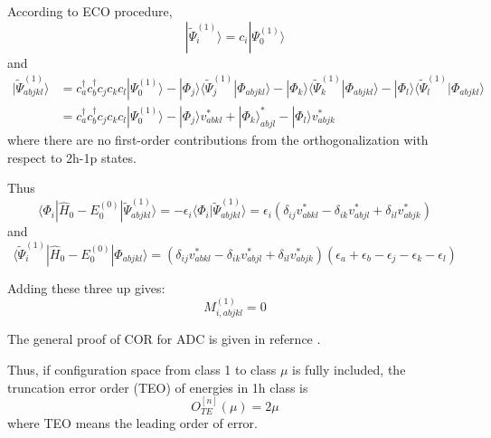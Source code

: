 According to ECO procedure,
\begin{equation}
	| \tilde{\Psi}_{i}^{(1)} \rangle=c_{i} | \Psi_{0}^{(1)} \rangle
\end{equation}
and
\begin{equation}
	\begin{aligned} | \tilde{\Psi}_{a b j k l}^{(1)} \rangle &=c_{a}^{\dagger} c_{b}^{\dagger} c_{j} c_{k} c_{l} | \Psi_{0}^{(1)} \rangle-| \Phi_{j} \rangle\langle\tilde{\Psi}_{j}^{(1)} | \Phi_{a b j k l}\rangle-| \Phi_{k} \rangle\langle\tilde{\Psi}_{k}^{(1)} | \Phi_{a b j k l}\rangle-| \Phi_{l} \rangle\langle\tilde{\Psi}_{l}^{(1)} | \Phi_{a b j k l}\rangle \\ &= c_{a}^{\dagger} c_{b}^{\dagger} c_{j} c_{k} c_{l} | \Psi_{0}^{(1)} \rangle-| \Phi_{j} \rangle v_{a b k l}^{*}+| \Phi_{k} \rangle_{a b j l}^{*}-| \Phi_{l} \rangle v_{a b j k}^{*} \end{aligned}
\end{equation}
where there are no first-order contributions from the orthogonalization with
respect to 2h-1p states.

Thus
\begin{equation}
	\langle\Phi_{i}|\hat{H}_{0}-E_{0}^{(0)}| \tilde{\Psi}_{a b j k l}^{(1)}\rangle=-\epsilon_{i}\langle\Phi_{i} | \tilde{\Psi}_{a b j k l}^{(1)}\rangle=\epsilon_{i}\left(\delta_{i j} v_{a b k l}^{*}-\delta_{i k} v_{a b j l}^{*}+\delta_{i l} v_{a b j k}^{*}\right)
\end{equation}
and
\begin{equation}
	\langle\tilde{\Psi}_{i}^{(1)}|\hat{H}_{0}-E_{0}^{(0)}| \Phi_{a b j k l}\rangle=\left(\delta_{i j} v_{a b k l}^{*}-\delta_{i k} v_{a b j l}^{*}+\delta_{i l} v_{a b j k}^{*}\right)\left(\epsilon_{a}+\epsilon_{b}-\epsilon_{j}-\epsilon_{k}-\epsilon_{l}\right)
\end{equation}

Adding these three up gives:
\begin{equation}
	M_{i, a b j k l}^{(1)}=0
\end{equation}

The general proof of COR for ADC is given in refernce \cite{main}.

Thus, if configuration space from class 1 to class $\mu$ is fully included, the truncation error order (TEO) of energies in 1h class is
\begin{equation}
	O_{T E}^{[n]}(\mu)=2\mu
\end{equation}
where TEO means the leading order of error.

